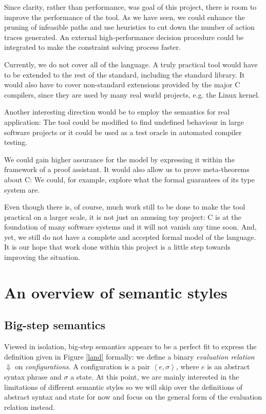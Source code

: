 \documentclass[a4paper,12pt]{scrbook}
\theoremstyle{plain}
\theoremstyle{definition}
\begin{document}
Since clarity, rather than performance, was goal of this project, there is room
to improve the performance of the tool. As we have seen, we could enhance the
pruning of infeasible paths and use heuristics to cut down the number of action
traces generated. An external high-performance decision procedure could be
integrated to make the constraint solving process faster.

Currently, we do not cover all of the language. A truly practical tool would
have to be extended to the rest of the standard, including the standard
library. It would also have to cover non-standard extensions provided by the
major C compilers, since they are used by many real world projects, e.g. the
Linux kernel.

Another interesting direction would be to employ the semantics for real
application: The tool could be modified to find undefined behaviour in large
software projects or it could be used as a test oracle in automated compiler
testing.

We could gain higher assurance for the model by expressing it within the
framework of a proof assistant. It would also allow us to prove meta-theorems
about C: We could, for example, explore what the formal guarantees of its type
system are.

Even though there is, of course, much work still to be done to make the tool
practical on a larger scale, it is not just an amusing toy project: C is at the
foundation of many software systems and it will not vanish any time soon. And,
yet, we still do not have a complete and accepted formal model of the
language. It is our hope that work done within this project is a little step
towards improving the situation.

{}


\appendix
\chapter{An overview of semantic styles}\label{semanticStyles}

\section{Big-step semantics}
Viewed in isolation, big-step semantics appears to be a perfect fit to express
the definition given in Figure \ref{land} formally: we define a binary
\textit{evaluation relation} $\Downarrow$ on \textit{configurations}.  A
configuration is a pair $\left< e, \sigma \right>$, where $e$ is an abstract
syntax phrase and $\sigma$ a state. At this point, we are mainly interested in
the limitations of different semantic styles so we will skip over the
definitions of abstract syntax and state for now and focus on the general form
of the evaluation relation instead.
\end{document}
